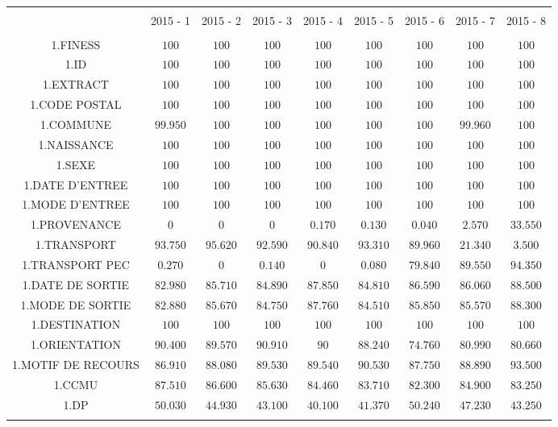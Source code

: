 \documentclass[]{article}
\begin{document}
\begin{table}[!htbp] \centering 
  \caption{} 
  \label{} 
\begin{tabular}{@{\extracolsep{5pt}} ccccccccc} 
\\[-1.8ex]\hline 
\hline \\[-1.8ex] 
 & 2015 - 1 & 2015 - 2 & 2015 - 3 & 2015 - 4 & 2015 - 5 & 2015 - 6 & 2015 - 7 & 2015 - 8 \\ 
\hline \\[-1.8ex] 
1.FINESS & $100$ & $100$ & $100$ & $100$ & $100$ & $100$ & $100$ & $100$ \\ 
1.ID & $100$ & $100$ & $100$ & $100$ & $100$ & $100$ & $100$ & $100$ \\ 
1.EXTRACT & $100$ & $100$ & $100$ & $100$ & $100$ & $100$ & $100$ & $100$ \\ 
1.CODE POSTAL & $100$ & $100$ & $100$ & $100$ & $100$ & $100$ & $100$ & $100$ \\ 
1.COMMUNE & $99.950$ & $100$ & $100$ & $100$ & $100$ & $100$ & $99.960$ & $100$ \\ 
1.NAISSANCE & $100$ & $100$ & $100$ & $100$ & $100$ & $100$ & $100$ & $100$ \\ 
1.SEXE & $100$ & $100$ & $100$ & $100$ & $100$ & $100$ & $100$ & $100$ \\ 
1.DATE D'ENTREE & $100$ & $100$ & $100$ & $100$ & $100$ & $100$ & $100$ & $100$ \\ 
1.MODE D'ENTREE & $100$ & $100$ & $100$ & $100$ & $100$ & $100$ & $100$ & $100$ \\ 
1.PROVENANCE & $0$ & $0$ & $0$ & $0.170$ & $0.130$ & $0.040$ & $2.570$ & $33.550$ \\ 
1.TRANSPORT & $93.750$ & $95.620$ & $92.590$ & $90.840$ & $93.310$ & $89.960$ & $21.340$ & $3.500$ \\ 
1.TRANSPORT PEC & $0.270$ & $0$ & $0.140$ & $0$ & $0.080$ & $79.840$ & $89.550$ & $94.350$ \\ 
1.DATE DE SORTIE & $82.980$ & $85.710$ & $84.890$ & $87.850$ & $84.810$ & $86.590$ & $86.060$ & $88.500$ \\ 
1.MODE DE SORTIE & $82.880$ & $85.670$ & $84.750$ & $87.760$ & $84.510$ & $85.850$ & $85.570$ & $88.300$ \\ 
1.DESTINATION & $100$ & $100$ & $100$ & $100$ & $100$ & $100$ & $100$ & $100$ \\ 
1.ORIENTATION & $90.400$ & $89.570$ & $90.910$ & $90$ & $88.240$ & $74.760$ & $80.990$ & $80.660$ \\ 
1.MOTIF DE RECOURS & $86.910$ & $88.080$ & $89.530$ & $89.540$ & $90.530$ & $87.750$ & $88.890$ & $93.500$ \\ 
1.CCMU & $87.510$ & $86.600$ & $85.630$ & $84.460$ & $83.710$ & $82.300$ & $84.900$ & $83.250$ \\ 
1.DP & $50.030$ & $44.930$ & $43.100$ & $40.100$ & $41.370$ & $50.240$ & $47.230$ & $43.250$ \\ 
\hline \\[-1.8ex] 
\end{tabular} 
\end{table}
\end{document}
